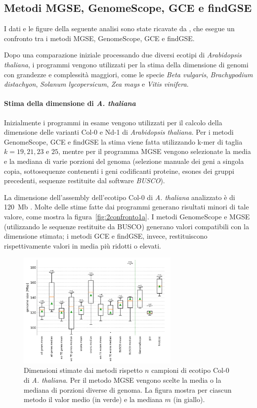 \documentclass[crop=false, class=book]{standalone}
\begin{document}
		
	\subsection{Metodi MGSE, GenomeScope, GCE e findGSE}
	I dati e le figure della seguente analisi sono state ricavate da \cite{pucker2019MGSE}, che esegue un confronto tra i metodi MGSE, GenomeScope, GCE e findGSE. 
	
	Dopo una comparazione iniziale processando due diversi ecotipi di \textit{Arabidopsis thaliana}, i programmi vengono utilizzati per la stima della dimensione di genomi con grandezze e complessità maggiori, come le specie \textit{Beta vulgaris}, \textit{Brachypodium distachyon}, \textit{Solanum lycopersicum}, \textit{Zea mays} e \textit{Vitis vinifera}. 
		
	\paragraph{Stima della dimensione di \textit{A. thaliana}}
	Inizialmente i programmi in esame vengono utilizzati per il calcolo della dimensione delle varianti Col-0 e Nd-1 di \textit{Arabidopsis thaliana}. Per i metodi GenomeScope, GCE e findGSE la stima viene fatta utilizzando k-mer di taglia $k = 19, 21, 23 \text{ e } 25$, mentre per il programma MGSE vengono selezionate la media e la mediana di varie porzioni del genoma (selezione manuale dei geni a singola copia, sottosequenze contenenti i geni codificanti proteine, \glspl{esone} dei gruppi precedenti, sequenze restituite dal software \textit{BUSCO}).
	
	La dimensione dell'assembly dell'\gls{ecotipo} Col-0 di \textit{A. thaliana} analizzato è di 120~Mb \cite{initiative2000analysis}. Molte delle stime fatte dai programmi generano risultati minori di tale valore, come mostra la figura~\vref{fig:2confronto1a}. I metodi GenomeScope e MGSE (utilizzando le sequenze restituite da BUSCO) generano valori compatibili con la dimensione stimata; i metodi GCE e findGSE, invece, restituiscono rispettivamente valori in media più ridotti o elevati.
	
	\begin{figure}[htp]
		\centering
		\includegraphics[width=0.7\textwidth]{capitoli/analisi/confronto/confronto2/1a.png}
		\caption{Dimensioni stimate dai metodi rispetto $n$ campioni di \gls{ecotipo} Col-0 di \textit{A. thaliana}. Per il metodo MGSE vengono scelte la media o la mediana di porzioni diverse di genoma. La figura mostra per ciascun metodo il valor medio (in verde) e la mediana $m$ (in giallo).}
		\label{fig:2confronto1a}
	\end{figure}
		
\end{document}
